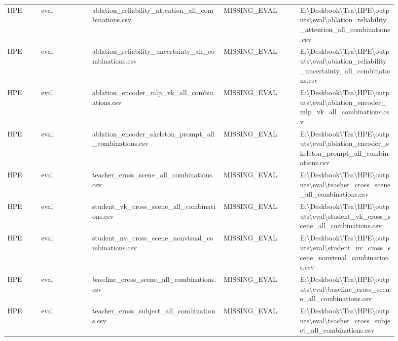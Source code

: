 \begin{longtable}{p{0.08\linewidth}p{0.12\linewidth}p{0.31\linewidth}p{0.18\linewidth}p{0.23\linewidth}}
HPE & eval & ablation\_reliability\_attention\_all\_combinations.csv & MISSING\_EVAL & \scriptsize E:\textbackslash{}Deskbook\textbackslash{}Tea\textbackslash{}HPE\textbackslash{}outputs\textbackslash{}eval\textbackslash{}ablation\_reliability\_attention\_all\_combinations.csv\\
HPE & eval & ablation\_reliability\_uncertainty\_all\_combinations.csv & MISSING\_EVAL & \scriptsize E:\textbackslash{}Deskbook\textbackslash{}Tea\textbackslash{}HPE\textbackslash{}outputs\textbackslash{}eval\textbackslash{}ablation\_reliability\_uncertainty\_all\_combinations.csv\\
HPE & eval & ablation\_encoder\_mlp\_vk\_all\_combinations.csv & MISSING\_EVAL & \scriptsize E:\textbackslash{}Deskbook\textbackslash{}Tea\textbackslash{}HPE\textbackslash{}outputs\textbackslash{}eval\textbackslash{}ablation\_encoder\_mlp\_vk\_all\_combinations.csv\\
HPE & eval & ablation\_encoder\_skeleton\_prompt\_all\_combinations.csv & MISSING\_EVAL & \scriptsize E:\textbackslash{}Deskbook\textbackslash{}Tea\textbackslash{}HPE\textbackslash{}outputs\textbackslash{}eval\textbackslash{}ablation\_encoder\_skeleton\_prompt\_all\_combinations.csv\\
HPE & eval & teacher\_cross\_scene\_all\_combinations.csv & MISSING\_EVAL & \scriptsize E:\textbackslash{}Deskbook\textbackslash{}Tea\textbackslash{}HPE\textbackslash{}outputs\textbackslash{}eval\textbackslash{}teacher\_cross\_scene\_all\_combinations.csv\\
HPE & eval & student\_vk\_cross\_scene\_all\_combinations.csv & MISSING\_EVAL & \scriptsize E:\textbackslash{}Deskbook\textbackslash{}Tea\textbackslash{}HPE\textbackslash{}outputs\textbackslash{}eval\textbackslash{}student\_vk\_cross\_scene\_all\_combinations.csv\\
HPE & eval & student\_nv\_cross\_scene\_nonvisual\_combinations.csv & MISSING\_EVAL & \scriptsize E:\textbackslash{}Deskbook\textbackslash{}Tea\textbackslash{}HPE\textbackslash{}outputs\textbackslash{}eval\textbackslash{}student\_nv\_cross\_scene\_nonvisual\_combinations.csv\\
HPE & eval & baseline\_cross\_scene\_all\_combinations.csv & MISSING\_EVAL & \scriptsize E:\textbackslash{}Deskbook\textbackslash{}Tea\textbackslash{}HPE\textbackslash{}outputs\textbackslash{}eval\textbackslash{}baseline\_cross\_scene\_all\_combinations.csv\\
HPE & eval & teacher\_cross\_subject\_all\_combinations.csv & MISSING\_EVAL & \scriptsize E:\textbackslash{}Deskbook\textbackslash{}Tea\textbackslash{}HPE\textbackslash{}outputs\textbackslash{}eval\textbackslash{}teacher\_cross\_subject\_all\_combinations.csv\\

\end{longtable}
